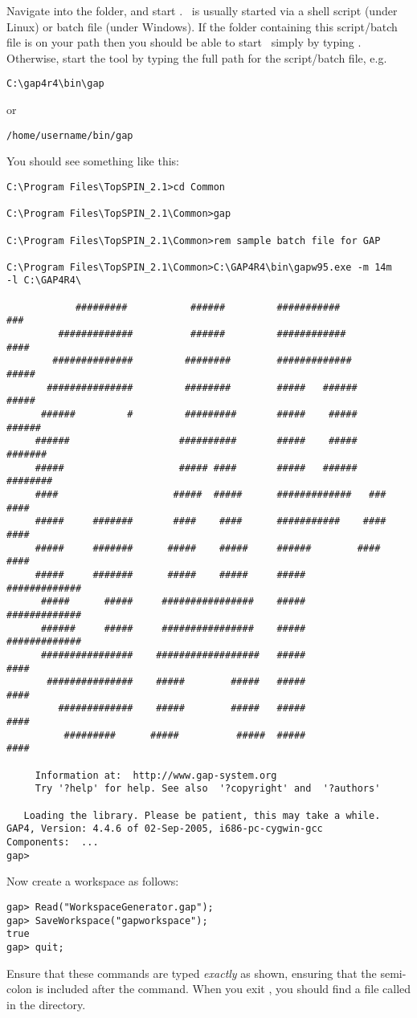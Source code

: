 Navigate into the  folder, and start \gap.  \gap\ is
usually started via a shell script (under Linux) or batch file (under
Windows).  If the folder containing this script/batch file is on your
path then you should be able to start \gap\ simply by typing .
Otherwise, start the tool by typing the full path for the script/batch file,
e.g.
%
\begin{lstlisting}
C:\gap4r4\bin\gap
\end{lstlisting}
%
or
\begin{lstlisting}
/home/username/bin/gap
\end{lstlisting}
%
You should see something like this:
%
\begin{lstlisting}
C:\Program Files\TopSPIN_2.1>cd Common

C:\Program Files\TopSPIN_2.1\Common>gap

C:\Program Files\TopSPIN_2.1\Common>rem sample batch file for GAP

C:\Program Files\TopSPIN_2.1\Common>C:\GAP4R4\bin\gapw95.exe -m 14m
-l C:\GAP4R4\

            #########           ######         ###########           ###
         #############          ######         ############         ####
        ##############         ########        #############       #####
       ###############         ########        #####   ######      #####
      ######         #         #########       #####    #####     ######
     ######                   ##########       #####    #####    #######
     #####                    ##### ####       #####   ######   ########
     ####                    #####  #####      #############   ###  ####
     #####     #######       ####    ####      ###########    ####  ####
     #####     #######      #####    #####     ######        ####   ####
     #####     #######      #####    #####     #####         #############
      #####      #####     ################    #####         #############
      ######     #####     ################    #####         #############
      ################    ##################   #####                ####
       ###############    #####        #####   #####                ####
         #############    #####        #####   #####                ####
          #########      #####          #####  #####                ####

     Information at:  http://www.gap-system.org
     Try '?help' for help. See also  '?copyright' and  '?authors'

   Loading the library. Please be patient, this may take a while.
GAP4, Version: 4.4.6 of 02-Sep-2005, i686-pc-cygwin-gcc
Components:  ...
gap>
\end{lstlisting}
%
Now create a workspace as follows:
%
\begin{lstlisting}
gap> Read("WorkspaceGenerator.gap");
gap> SaveWorkspace("gapworkspace");
true
gap> quit;
\end{lstlisting}
%
Ensure that these commands are typed \emph{exactly} as shown,
ensuring that the semi-colon is included after the 
command.  When you exit \gap, you should find a file called
 in the  directory.
%
